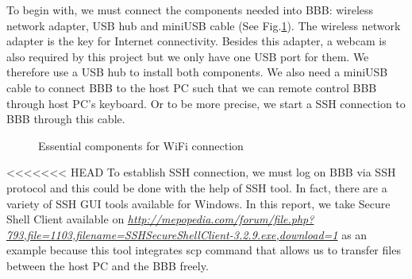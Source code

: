 \documentclass[12pt,journal,draftclsnofoot,onecolumn]{IEEEtran}
\begin{document}
To begin with, we must connect the components needed into BBB: wireless network adapter, USB hub and miniUSB cable (See Fig.\ref{WiFi}). The wireless network adapter is the key for Internet connectivity. Besides this adapter, a webcam is also required by this project but we only have one USB port for them.  We therefore use a USB hub to install both components. We also need a miniUSB cable to connect BBB to the host PC such that we can remote control BBB through host PC's keyboard. Or to be more precise, we start a SSH connection to BBB through this cable.

\begin{figure}[htb]
	\centering
     \caption{Essential components for WiFi connection}
     \label{WiFi}
     \end{figure}

<<<<<<< HEAD
To establish SSH connection, we must log on BBB via SSH protocol and this could be done with the help of SSH tool. In fact, there are a variety of SSH GUI tools available for Windows. In this report, we take Secure Shell Client available on \textcolor{blue}{\textit{\url{http://mepopedia.com/forum/file.php?793,file=1103,filename=SSHSecureShellClient-3.2.9.exe,download=1}}}  as an example because this tool integrates scp command that allows us to transfer files between the host PC and the BBB freely.
\end{document}
